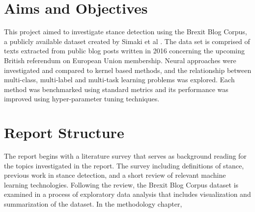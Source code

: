 \documentclass[Dissertation.tex]{subfiles}
\begin{document}
\begin{comment}
In such politically turbulent times there is significant interest in applying machine learning and natural language processing (NLP) techniques to political social media content, such as opinion mining and sentiment analysis. This project considers the related task of stance detection, which in the simplest case involves determining if a text in agreement or disagreement with a given proposition. As one of the most significant and polarizing political events in a generation, the Brexit debate is an ideal topic for investigating stance detection.
\end{comment}

\section{Aims and Objectives}
This project aimed to investigate stance detection using the Brexit Blog Corpus, a publicly available dataset created by Simaki et al \cite{simakiAnnotatingSpeakerStance2017}. The data set is comprised of texts extracted from public blog posts written in 2016 concerning the upcoming British referendum on European Union membership. Neural approaches were investigated and compared to kernel based methods, and the relationship between multi-class, multi-label and multi-task learning problems was explored. Each method was benchmarked using standard metrics and its performance was improved using hyper-parameter tuning techniques.

\section{Report Structure}
The report begins with a literature survey that serves as background reading for the topics investigated in the report. The survey including definitions of stance, previous work in stance detection, and a short review of relevant machine learning technologies. Following the review, the Brexit Blog Corpus dataset is examined in a process of exploratory data analysis that includes visualization and summarization of the dataset. In the methodology chapter, 
\end{document}
